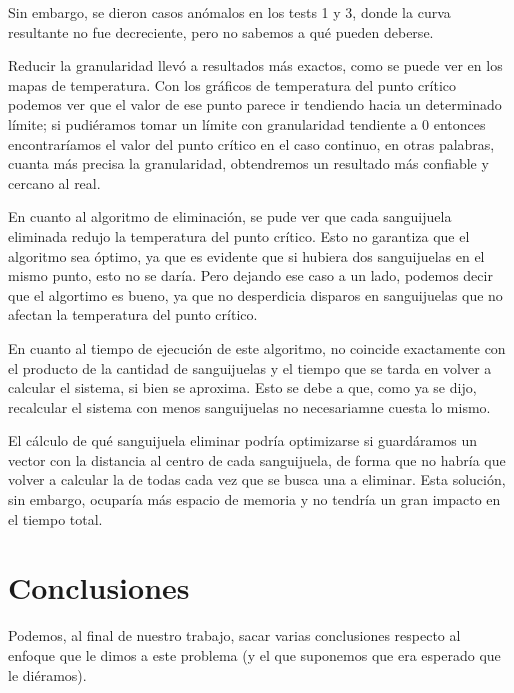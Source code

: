 \documentclass[spanish,a4paper]{article}
\begin{document}
Sin embargo, se dieron casos anómalos en los tests 1 y 3, donde la curva resultante no fue decreciente, pero no sabemos a qué pueden deberse.

Reducir la granularidad llevó a resultados más exactos, como se puede ver en los mapas de temperatura. Con los gráficos de temperatura del punto crítico podemos ver que el valor de ese punto parece ir tendiendo hacia un determinado límite; si pudiéramos tomar un límite con granularidad tendiente a 0 entonces encontraríamos el valor del punto crítico en el caso continuo, en otras palabras, cuanta más precisa la granularidad, obtendremos un resultado más confiable y cercano al real.

En cuanto al algoritmo de eliminación, se pude ver que cada sanguijuela eliminada redujo la temperatura del punto crítico. Esto no garantiza que el algoritmo sea óptimo, ya que es evidente que si hubiera dos sanguijuelas en el mismo punto, esto no se daría. Pero dejando ese caso a un lado, podemos decir que el algortimo es bueno, ya que no desperdicia disparos en sanguijuelas que no afectan la temperatura del punto crítico.

En cuanto al tiempo de ejecución de este algoritmo, no coincide exactamente con el producto de la cantidad de sanguijuelas y el tiempo que se tarda en volver a calcular el sistema, si bien se aproxima. Esto se debe a que, como ya se dijo, recalcular el sistema con menos sanguijuelas no necesariamne cuesta lo mismo.

El cálculo de qué sanguijuela eliminar podría optimizarse si guardáramos un vector con la distancia al centro de cada sanguijuela, de forma que no habría que volver a calcular la de todas cada vez que se busca una a eliminar. Esta solución, sin embargo, ocuparía más espacio de memoria y no tendría un gran impacto en el tiempo total.


\newpage

\section{Conclusiones}
\label{sec:conclusiones}
Podemos, al final de nuestro trabajo, sacar varias conclusiones respecto al enfoque que le dimos a este problema (y el que suponemos que era esperado que le diéramos).\\
\end{document}
